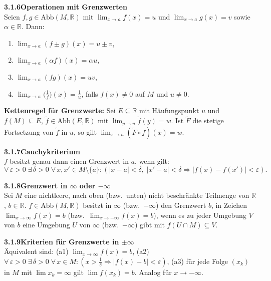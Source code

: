 \documentclass[a4paper,12pt]{article}
\newcommand{\gentry}[3]{%
  \noindent\textbf{#1\quad #2}\nopagebreak\\[0.2em]
  #3\par\smallskip
}
\begin{document}
\gentry{3.1.6}{Operationen mit Grenzwerten}{%
  Seien $f, g \in \mathrm{Abb}(M, \mathbb{R})$ mit $\lim_{x \to a} f(x) = u$ und
  $\lim_{x \to a} g(x) = v$ sowie $\alpha \in \mathbb{R}$. Dann:
  \begin{enumerate}[label=(\roman*),topsep=2pt,itemsep=1pt]
    \item $\lim_{x \to a}(f \pm g)(x) = u \pm v$,
    \item $\lim_{x \to a}(\alpha f)(x) = \alpha u$,
    \item $\lim_{x \to a}(f g)(x) = u v$,
    \item $\lim_{x \to a}\bigl(\tfrac{1}{f}\bigr)(x) = \tfrac{1}{u}$, falls $f(x) \neq 0$ auf $M$ und $u \neq 0$.
  \end{enumerate}
  \textbf{Kettenregel f\"ur Grenzwerte:} Sei $E \subseteq \mathbb{R}$ mit H\"aufungspunkt $u$ und
  $f(M) \subseteq E$, $\tilde f \in \mathrm{Abb}(E, \mathbb{R})$ mit $\lim_{y \to u} \tilde f(y) = w$.
  Ist $\tilde F$ die stetige Fortsetzung von $\tilde f$ in $u$, so gilt
  $\lim_{x \to a}(\tilde F \circ f)(x) = w$.
}

\gentry{3.1.7}{Cauchykriterium}{%
  $f$ besitzt genau dann einen Grenzwert in $a$, wenn gilt:
  \[
    \forall\, \varepsilon > 0 \; \exists\, \delta > 0 \; \forall\, x, x' \in M \setminus \{a\}:
    (|x - a| < \delta,\; |x' - a| < \delta \Rightarrow |f(x) - f(x')| < \varepsilon).
  \]
}

\gentry{3.1.8}{Grenzwert in $\infty$ oder $-\infty$}{%
  Sei $M$ eine nichtleere, nach oben (bzw.\ unten) nicht beschr\"ankte Teilmenge von
  $\mathbb{R}$, $b \in \mathbb{R}$. $f \in \mathrm{Abb}(M, \mathbb{R})$ besitzt in
  $\infty$ (bzw.\ $-\infty$) den Grenzwert $b$, in Zeichen
  $\lim_{x \to \infty} f(x) = b$ (bzw.\ $\lim_{x \to -\infty} f(x) = b$), wenn es
  zu jeder Umgebung $V$ von $b$ eine Umgebung $U$ von $\infty$ (bzw.\ $-\infty$) gibt mit
  $f(U \cap M) \subseteq V$.
}

\gentry{3.1.9}{Kriterien f\"ur Grenzwerte in $\pm\infty$}{%
  \"Aquivalent sind:
  (a1) $\lim_{x \to \infty} f(x) = b$,
  (a2) $\forall\, \varepsilon > 0 \; \exists\, \delta > 0 \; \forall\, x \in M:
       (x > \tfrac{1}{\delta} \Rightarrow |f(x) - b| < \varepsilon)$,
  (a3) f\"ur jede Folge $(x_k)$ in $M$ mit $\lim x_k = \infty$ gilt $\lim f(x_k) = b$.
  Analog f\"ur $x \to -\infty$.
}
\end{document}
